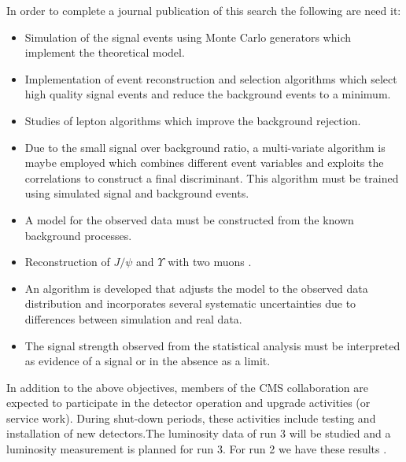 \documentclass[final,3p]{CSP}
\begin{document}
In order to complete a journal publication of this search the following are need it:
\begin{itemize}
\item Simulation of the signal events using Monte Carlo generators which implement the theoretical model.
\item Implementation of event reconstruction and selection algorithms which select high quality signal events and reduce the background events to a minimum.
\item Studies of lepton algorithms which improve the background rejection.
\item Due to the small signal over background ratio, a multi-variate algorithm is maybe employed which combines different event variables and exploits the correlations to construct a final discriminant. This algorithm must be trained using simulated signal and background events.
\item A model for the observed data must be constructed from the known background processes. 
\item Reconstruction of $J/\psi$ and $\Upsilon$ with two muons \cite{Khachatryan_2014,Sirunyan_2018}.
\item An algorithm is developed that adjusts the model to the observed data distribution and incorporates several systematic uncertainties due to differences between simulation and real data.
\item The signal strength observed from the statistical analysis must be interpreted as evidence of a signal or in the absence as a limit. %
\end{itemize}

In addition to the above objectives, members of the CMS collaboration are expected to participate in the detector operation and upgrade activities (or service work). During shut-down periods, these activities include testing and installation of new detectors.The luminosity data of run 3 will be studied and a luminosity measurement is planned for run 3. For run 2 we have these results \cite{CMS-PAS-LUM-17-004,CMS-PAS-LUM-18-002}.


%
\end{document}
